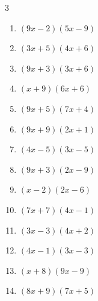 \begin{multicols}{3}
\begin{enumerate}

  \item $(9x-2)(5x-9)$


  \item $(3x+5)(4x+6)$


  \item $(9x+3)(3x+6)$


  \item $(x+9)(6x+6)$


\columnbreak %

  \item $(9x+5)(7x+4)$


  \item $(9x+9)(2x+1)$


  \item $(4x-5)(3x-5)$


  \item $(9x+3)(2x-9)$


  \item $(x-2)(2x-6)$


  \item $(7x+7)(4x-1)$


  \item $(3x-3)(4x+2)$


  \item $(4x-1)(3x-3)$


  \item $(x+8)(9x-9)$


  \item $(8x+9)(7x+5)$



\end{enumerate}
\end{multicols}
